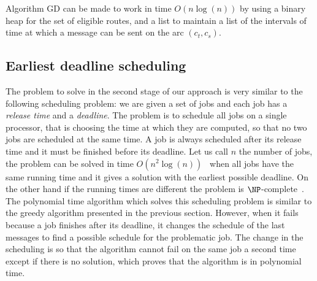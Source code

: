 \documentclass[10pt, conference, letterpaper]{IEEEtran}
\begin{document}
    Algorithm GD can be made to work in time $O(n\log(n))$ by using a binary heap for the set of eligible routes, and a list to maintain a list of the intervals of time at which a message can be sent on the arc $(c_t,c_s)$.
%    
%     
    

    
     
     \subsection{Earliest deadline scheduling}
     
     
     The problem to solve in the second stage of our approach is very similar to the following scheduling problem: 
     we are given a set of jobs and each job has a \emph{release time} and a \emph{deadline}. 
     The problem is to schedule all jobs on a single processor, that is choosing the time at which they are computed, so that no two jobs are scheduled at the same time. A job is always scheduled after its release time and it must be finished before its deadline. Let us call $n$ the number of jobs, the problem can be solved in time $O(n^2\log(n))$~\cite{simons1978fast} when all jobs have the same running time and it gives a solution with the earliest possible deadline. On the other hand if the running times are different the problem is $\NP$-complete~\cite{lenstra1977complexity}. 
     The  polynomial time algorithm  which solves this scheduling problem is similar to the greedy algorithm presented in the previous section. However, when it fails because a job finishes after its deadline, it changes the schedule of the last messages to find a possible schedule for the problematic job. The change in the scheduling is so that the algorithm cannot fail on the same job a second time except if there is no solution, which proves that the algorithm is in polynomial time.
     
\end{document}
